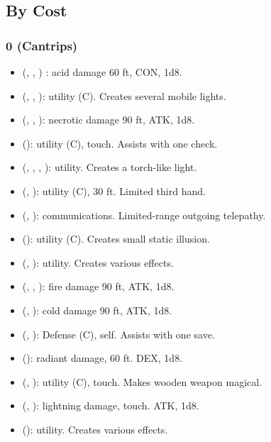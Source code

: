 \subsection{By Cost}
\twocolumns
\subsubsection{0 (Cantrips)}
\begin{itemize}
	\item {} (, , ) : acid damage 60 ft, CON, 1d8.
	\item {} (, , ): utility (C). Creates several mobile lights.
	\item {} (, , ): necrotic damage 90 ft, ATK, 1d8.
	\item {} (): utility (C), touch. Assists with one check.
	\item {} (, , , ): utility. Creates a torch-like light.
	\item {} (, ): utility (C), 30 ft. Limited third hand.
	\item {} (, ): communications. Limited-range outgoing telepathy.
	\item {} (): utility (C). Creates small static illusion.
	\item {} (, ): utility. Creates various effects.
	\item {} (, , ): fire damage 90 ft, ATK, 1d8.
	\item {} (, ): cold damage 90 ft, ATK, 1d8.
	\item {} (, ): Defense (C), self. Assists with one save.
	\item {} (): radiant damage, 60 ft. DEX, 1d8.
	\item {} (, ): utility (C), touch. Makes wooden weapon magical.
	\item {} (, ): lightning damage, touch. ATK, 1d8.
	\item {} (): utility. Creates various effects.
\end{itemize}

